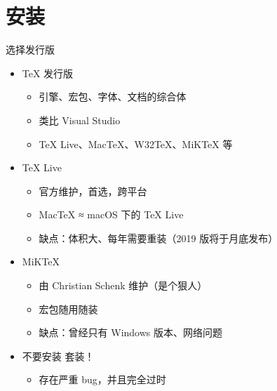 \section{安装}

\begin{frame}{选择发行版}
\begin{itemize}
  \item \TeX{} 发行版

    \begin{itemize}
      \item 引擎、宏包、字体、文档的综合体
      \item 类比 Visual Studio
      \item \TeX{} Live、Mac\TeX{}、W32\TeX{}、MiK\TeX{} 等
    \end{itemize} \pause

  \item \TeX{} Live 

    \begin{itemize}
      \item 官方维护，首选，跨平台
      \item Mac\TeX{} ≈ macOS 下的 \TeX{} Live
      \item 缺点：体积大、每年需要重装（2019 版将于月底发布）
    \end{itemize}

  \item MiK\TeX{} 

    \begin{itemize}
      \item 由 Christian Schenk 维护（是个狠人）
      \item 宏包随用随装
      \item 缺点：曾经只有 Windows 版本、网络问题
    \end{itemize} \pause

  \item \alert{不要安装 \CTeX{} 套装！}

    \begin{itemize}
      \item \alert{存在严重 bug，并且完全过时}
    \end{itemize}
\end{itemize}
\end{frame}

